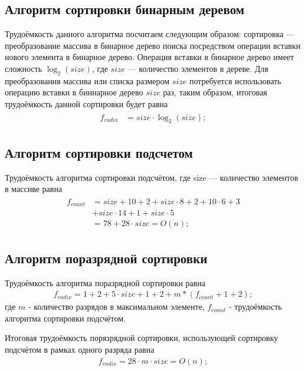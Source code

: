 \subsection{Алгоритм сортировки бинарным деревом}

Трудоёмкость данного алгоритма посчитаем следующим образом: сортировка --- преобразование массива в бинарное дерево поиска посредством операции вставки нового элемента в бинарное дерево.
Операция вставки в бинарное дерево имеет сложность $ \log_{2}(size)$, где $size$ --- количество элементов в дереве.
Для преобразования массива или списка размером $size$ потребуется использовать операцию вставки в биннарное дерево $size$ раз, таким образом, итоговая трудоёмкость данной сортировки будет равна 
\begin{align}
	\begin{split}
		\label{for:binary_sort_perf}
		f_{radix} &= size \cdot \log_{2}(size);
	\end{split}
\end{align}


\subsection{Алгоритм сортировки подсчетом}

Трудоёмкость алгоритма сортировки подсчётом, где size --- количество элементов в массиве равна
\begin{align}
	\begin{split}
		\label{for:count_sort_perf}
		f_{count} &= size + 10  + 2 + size \cdot 8 + 2 + 10 \cdot 6 + 3 \\
		&+ size \cdot 14 + 1 + size \cdot 5 \\
		&= 78 + 28 \cdot size = O(n);
	\end{split}
\end{align}

\subsection{Алгоритм поразрядной сортировки}

Трудоёмкость алгоритма поразрядной сортировки равна
\begin{align}
	\label{for:radix_sort_perf}
	f_{radix} = 1 + 2 + 5 \cdot size + 1 + 2 + m * (f_{count} + 1 + 2);
\end{align}
где $m$ - количество разрядов в максимальном элементе, $f_{count}$ - трудоёмкость алгоритма сортировки подсчётом.

Итоговая трудоёмкость порязрядной сортировки, использующей сортировку подсчётом в рамках одного разряда равна 
\begin{align}
	f_{radix} = 28 \cdot m \cdot size = O(n);
\end{align}

